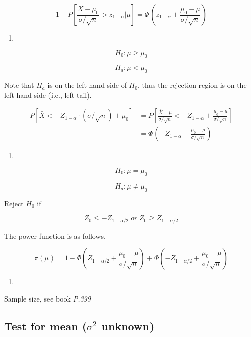 \documentclass[]{book}
\begin{document}
\[1-P[\frac{\bar{X}-\mu_0}{\sigma/\sqrt{n}}> z_{1-\alpha} |\mu]=\Phi(z_{1-\alpha} +\frac{ \mu_0-\mu}{\sigma/\sqrt{n}} )\]

\begin{enumerate}
\def\labelenumi{(\arabic{enumi})}
\setcounter{enumi}{1}
\item
\end{enumerate}

\[H_0: \mu \geq \mu_0\]

\[H_a: \mu < \mu_0\]

Note that \(H_a\) is on the left-hand side of \(H_0\), thus the rejection region is on the left-hand side (i.e., left-tail).

\[\begin{aligned} P[\bar{X}<-Z_{1-\alpha} \cdot (\sigma/\sqrt{n})+\mu_0] &=P[\frac{\bar{X}-\mu}{\sigma/\sqrt{n}}<-Z_{1-\alpha}+\frac{\mu_0-\mu}{\sigma/\sqrt{n}}] \\ &= \Phi(-Z_{1-\alpha}+\frac{\mu_0-\mu}{\sigma/\sqrt{n}}) \end{aligned}\]

\begin{enumerate}
\def\labelenumi{(\arabic{enumi})}
\setcounter{enumi}{2}
\item
\end{enumerate}

\[H_0: \mu = \mu_0\]

\[H_a: \mu \neq \mu_0\]

Reject \(H_0\) if

\[Z_0 \leq -Z_{1-\alpha/2} \; or \; Z_0 \geq Z_{1-\alpha/2}\]

The power function is as follows.

\[\pi(\mu) =1-\Phi(Z_{1-\alpha/2}+\frac{\mu_0-\mu}{\sigma/\sqrt{n}})+\Phi(-Z_{1-\alpha/2}+\frac{\mu_0-\mu}{\sigma/\sqrt{n}})\]

\begin{enumerate}
\def\labelenumi{(\arabic{enumi})}
\setcounter{enumi}{3}
\item
\end{enumerate}

Sample size, see book \emph{P.399}

\hypertarget{test-for-mean-sigma2-unknown}{%
\subsection{\texorpdfstring{Test for mean (\(\sigma^2\) unknown)}{Test for mean (\textbackslash sigma\^{}2 unknown)}}\label{test-for-mean-sigma2-unknown}}
\end{document}
